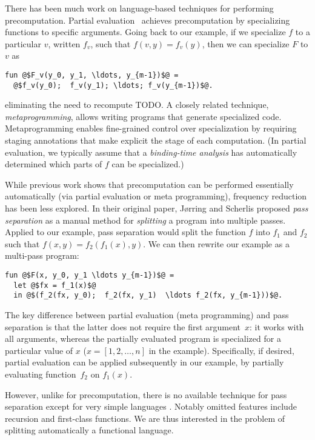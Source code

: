 There has been much work on language-based techniques for performing
precomputation. Partial evaluation~\cite{futamura71,jones96} achieves
precomputation by specializing functions to specific arguments. Going back to
our example, if we specialize $f$ to a particular $v$, written $f_v$, such that
$f(v,y) = f_v(y)$, then we can specialize $F$ to $v$ as
\begin{lstlisting}
fun @$F_v(y_0, y_1, \ldots, y_{m-1})$@ = 
  @$f_v(y_0);  f_v(y_1); \ldots; f_v(y_{m-1})$@.
\end{lstlisting}
eliminating the need to recompute
TODO.
%
A closely related technique, {\em metaprogramming}, allows writing programs that
generate specialized code. Metaprogramming enables fine-grained control over
specialization by requiring staging annotations that make explicit the stage of
each computation. (In partial evaluation, we typically assume that a
\emph{binding-time analysis} has automatically determined which parts of $f$ can
be specialized.)

While previous work shows that precomputation can be performed
essentially automatically (via partial evaluation or meta
programming), frequency reduction has been less explored.  In their
original paper, J{\o}rring and Scherlis proposed {\em pass separation}
as a manual method for {\em splitting} a program into multiple passes.
%
Applied to our example, pass separation would split the function $f$
into $f_1$ and $f_2$ such that $f(x,y) = f_2(f_1(x),y)$.  We can then
rewrite our example as a multi-pass program:
%
\begin{lstlisting}
fun @$F(x, y_0, y_1 \ldots y_{m-1})$@ = 
  let @$fx = f_1(x)$@
  in @$(f_2(fx, y_0);  f_2(fx, y_1)  \ldots f_2(fx, y_{m-1}))$@.
\end{lstlisting}
%
The key difference between partial evaluation (meta programming) and
pass separation is that the latter does not require the first
argument~$x$: it works with all arguments, whereas the partially
evaluated program is specialized for a particular value of $x$ ($x =
[1,2, \ldots, n]$ in the example). Specifically, if desired, partial
evaluation can be applied subsequently in our example, by partially
evaluating function~$f_2$ on $f_1(x)$.

However, unlike for precomputation, there is no available technique
for pass separation except for very simple languages
\cite{knoblock96,Proudfoot:2001,Foley:2011,He:2014}.  Notably omitted
features include recursion and first-class functions.  We are thus
interested in the problem of splitting automatically a functional
language.
%

